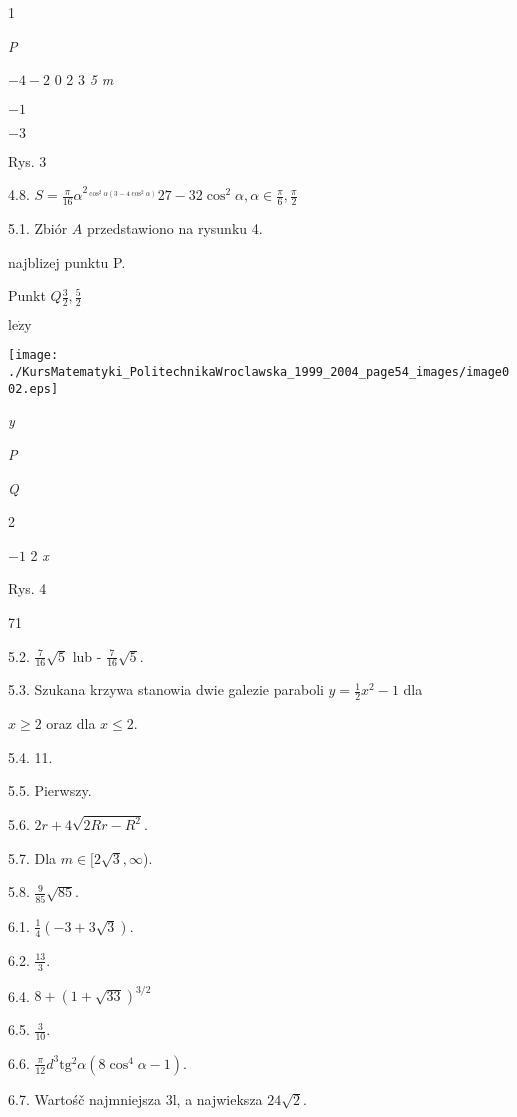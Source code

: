 \documentclass[a4paper,12pt]{article}
\begin{document}
1

{\it P}

$-4  -2$  0 2 3  {\it 5 m}

$-1$

$-3$

Rys. 3

4.8. $S=\displaystyle \frac{\pi}{16}\alpha^{2_{\cos^{2}\alpha(3-4\cos^{2}\alpha)}}27-32\cos^{2}\alpha, \alpha\in \displaystyle \frac{\pi}{6}, \displaystyle \frac{\pi}{2}$

5.1. Zbiór $A$ przedstawiono na rysunku 4.

najblizej punktu P.

Punkt $Q \displaystyle \frac{3}{2}, \displaystyle \frac{5}{2}$

$\mathrm{l}\mathrm{e}\dot{\mathrm{z}}\mathrm{y}$
\begin{center}
\texttt{[image: ./KursMatematyki\_PolitechnikaWroclawska\_1999\_2004\_page54\_images/image002.eps]}
\end{center}
{\it y}

{\it P}

{\it Q}

2

$-1$  2  {\it x}

Rys. 4





71

5.2. $\displaystyle \frac{7}{16}\sqrt{5}$ lub - $\displaystyle \frac{7}{16}\sqrt{5}.$

5.3. Szukana krzywa stanowia dwie galezie paraboli $y= \displaystyle \frac{1}{2}x^{2}-1$ dla

$x\geq 2$ oraz dla $x\leq 2.$

5.4. 11.

5.5. Pierwszy.

5.6. $2r+4\sqrt{2Rr-R^{2}}.$

5.7. Dla $ m\in [2\sqrt{3},\infty$).

5.8. $\displaystyle \frac{9}{85}\sqrt{85}.$

6.1. $\displaystyle \frac{1}{4}(-3+3\sqrt{3}).$

6.2. $\displaystyle \frac{13}{3}.$

6.4. $8+(1+\sqrt{33})^{3/2}$

6.5. $\displaystyle \frac{3}{10}.$

6.6. $\displaystyle \frac{\pi}{12}d^{3}\mathrm{t}\mathrm{g}^{2}\alpha(8\cos^{4}\alpha-1).$

6.7. Wartośč najmniejsza 3l, a najwieksza $24\sqrt{2}$.
\end{document}
